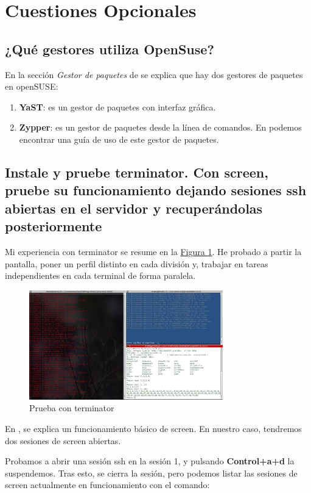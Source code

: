 \documentclass[10pt,a4paper,spanish]{article}
\numberwithin{equation}{section} %
\numberwithin{figure}{section} %
\numberwithin{table}{section} %
\begin{document}
\section{Cuestiones Opcionales}
\subsection{¿Qué gestores utiliza OpenSuse?}
En la sección \textit{Gestor de paquetes} de \cite{wikisuse} se explica que hay dos gestores de paquetes en openSUSE:
\begin{enumerate}[$\bullet$]
    \item \textbf{YaST}: es un gestor de paquetes con interfaz gráfica.
    \item \textbf{Zypper}: es un gestor de paquetes desde la línea de comandos. En \cite{zypper} podemos encontrar una guía de uso de este gestor de paquetes.
\end{enumerate}

\subsection{Instale y pruebe terminator. Con screen, pruebe su funcionamiento dejando sesiones ssh abiertas en el servidor y recuperándolas posteriormente}
Mi experiencia con terminator se resume en la \hyperref[terminator]{Figura \ref*{terminator}}. He probado a partir la pantalla, poner un perfil distinto en cada división y, trabajar en tareas independientes en cada terminal de forma paralela.

\begin{figure}[!h]
\centering
\includegraphics[width=0.75\textwidth]{16}
\caption{Prueba con terminator}
\label{terminator}
\end{figure}

En \cite{screen}, se explica un funcionamiento básico de screen. En nuestro caso, tendremos dos sesiones de screen abiertas.

Probamos a abrir una sesión ssh en la sesión 1, y pulsando \textbf{Control+a+d} la suspendemos. Tras esto, se cierra la sesión, pero podemos listar las sesiones de screen actualmente en funcionamiento con el comando:
\end{document}

